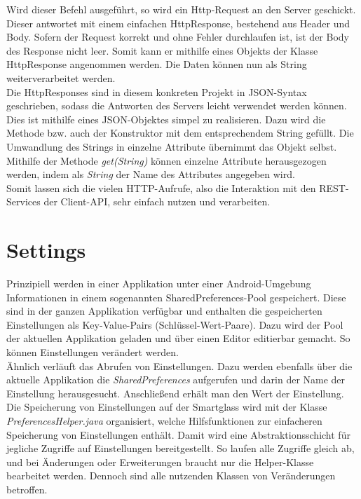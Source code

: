 Wird dieser Befehl ausgeführt, so wird ein Http-Request an den Server geschickt. Dieser antwortet mit einem einfachen HttpResponse, bestehend aus Header und Body. Sofern der Request korrekt und ohne Fehler durchlaufen ist, ist der Body des Response nicht leer. Somit kann er mithilfe eines Objekts der Klasse HttpResponse angenommen werden. Die Daten können nun als String weiterverarbeitet werden.\\

Die HttpResponses sind in diesem konkreten Projekt in \acs{JSON}-Syntax geschrieben, sodass die Antworten des Servers leicht verwendet werden können. Dies ist mithilfe eines JSON-Objektes simpel zu realisieren. Dazu wird die Methode bzw. auch der Konstruktor mit dem entsprechendem String gefüllt. Die Umwandlung des Strings in einzelne Attribute übernimmt das Objekt selbst. Mithilfe der Methode \textit{get(String)} können einzelne Attribute herausgezogen werden, indem als \textit{String} der Name des Attributes angegeben wird.\\

Somit lassen sich die vielen HTTP-Aufrufe, also die Interaktion mit den REST-Services der Client-API, sehr einfach nutzen und verarbeiten.

\section{Settings}
\label{sec:settings}
Prinzipiell werden in einer Applikation unter einer Android-Umgebung Informationen in einem sogenannten SharedPreferences-Pool gespeichert. Diese sind in der ganzen Applikation verfügbar und enthalten die gespeicherten Einstellungen als Key-Value-Pairs (Schlüssel-Wert-Paare). Dazu wird der Pool der aktuellen Applikation geladen und über einen Editor editierbar gemacht. So können Einstellungen verändert werden.\\
Ähnlich verläuft das Abrufen von Einstellungen. Dazu werden ebenfalls über die aktuelle Applikation die \emph{SharedPreferences} aufgerufen und darin der Name der Einstellung herausgesucht. Anschließend erhält man den Wert der Einstellung.\\

Die Speicherung von Einstellungen auf der Smartglass wird mit der Klasse \emph{PreferencesHelper.java} organisiert, welche Hilfsfunktionen zur einfacheren Speicherung von Einstellungen enthält. Damit wird eine Abstraktionsschicht für jegliche Zugriffe auf Einstellungen bereitgestellt. So laufen alle Zugriffe gleich ab, und bei Änderungen oder Erweiterungen braucht nur die Helper-Klasse bearbeitet werden. Dennoch sind alle nutzenden Klassen von Veränderungen betroffen. 


